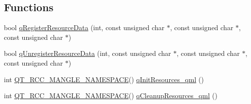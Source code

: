 \subsection*{Functions}
\begin{DoxyCompactItemize}
\item 
bool \hyperlink{build-analizer__host-_desktop___qt__5__9__0___g_c_c__64bit-debug_2qrc__qml_8cpp_a2ce5a6cde5b318dc75442940471e05f7}{q\+Register\+Resource\+Data} (int, const unsigned char $\ast$, const unsigned char $\ast$, const unsigned char $\ast$)
\item 
bool \hyperlink{build-analizer__host-_desktop___qt__5__9__0___g_c_c__64bit-debug_2qrc__qml_8cpp_a54b96c9f44d004fc0ea13bb581f97a71}{q\+Unregister\+Resource\+Data} (int, const unsigned char $\ast$, const unsigned char $\ast$, const unsigned char $\ast$)
\item 
int \hyperlink{build-analizer__host-_desktop___qt__5__9__0___g_c_c__64bit-_release_2qrc__qml_8cpp_a590f80ddb226779f6f432d80438ea190}{Q\+T\+\_\+\+R\+C\+C\+\_\+\+M\+A\+N\+G\+L\+E\+\_\+\+N\+A\+M\+E\+S\+P\+A\+C\+E}() \hyperlink{build-analizer__host-_desktop___qt__5__9__0___g_c_c__64bit-debug_2qrc__qml_8cpp_a68995df47257e443e5ab606848a493fc}{q\+Init\+Resources\+\_\+qml} ()
\item 
int \hyperlink{build-analizer__host-_desktop___qt__5__9__0___g_c_c__64bit-_release_2qrc__qml_8cpp_a590f80ddb226779f6f432d80438ea190}{Q\+T\+\_\+\+R\+C\+C\+\_\+\+M\+A\+N\+G\+L\+E\+\_\+\+N\+A\+M\+E\+S\+P\+A\+C\+E}() \hyperlink{build-analizer__host-_desktop___qt__5__9__0___g_c_c__64bit-debug_2qrc__qml_8cpp_a83e03aa6ea6d409abf7c8ccfc5746ef0}{q\+Cleanup\+Resources\+\_\+qml} ()
\end{DoxyCompactItemize}


